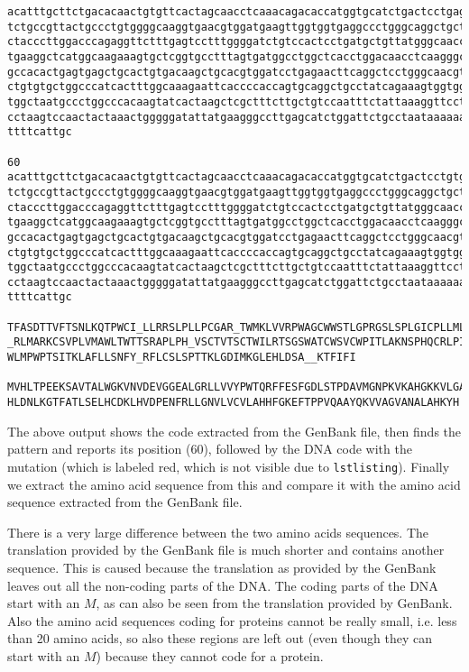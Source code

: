 \documentclass[11pt,a4paper,onecolumn]{article}
\begin{document}
\begin{lstlisting}[mathescape] 
acatttgcttctgacacaactgtgttcactagcaacctcaaacagacaccatggtgcatctgactcctgaggagaag
tctgccgttactgccctgtggggcaaggtgaacgtggatgaagttggtggtgaggccctgggcaggctgctggtggt
ctacccttggacccagaggttctttgagtcctttggggatctgtccactcctgatgctgttatgggcaaccctaagg
tgaaggctcatggcaagaaagtgctcggtgcctttagtgatggcctggctcacctggacaacctcaagggcaccttt
gccacactgagtgagctgcactgtgacaagctgcacgtggatcctgagaacttcaggctcctgggcaacgtgctggt
ctgtgtgctggcccatcactttggcaaagaattcaccccaccagtgcaggctgcctatcagaaagtggtggctggtg
tggctaatgccctggcccacaagtatcactaagctcgctttcttgctgtccaatttctattaaaggttcctttgttc
cctaagtccaactactaaactgggggatattatgaagggccttgagcatctggattctgcctaataaaaaacattta
ttttcattgc

60
acatttgcttctgacacaactgtgttcactagcaacctcaaacagacaccatggtgcatctgactcctgtggagaag
tctgccgttactgccctgtggggcaaggtgaacgtggatgaagttggtggtgaggccctgggcaggctgctggtggt
ctacccttggacccagaggttctttgagtcctttggggatctgtccactcctgatgctgttatgggcaaccctaagg
tgaaggctcatggcaagaaagtgctcggtgcctttagtgatggcctggctcacctggacaacctcaagggcaccttt
gccacactgagtgagctgcactgtgacaagctgcacgtggatcctgagaacttcaggctcctgggcaacgtgctggt
ctgtgtgctggcccatcactttggcaaagaattcaccccaccagtgcaggctgcctatcagaaagtggtggctggtg
tggctaatgccctggcccacaagtatcactaagctcgctttcttgctgtccaatttctattaaaggttcctttgttc
cctaagtccaactactaaactgggggatattatgaagggccttgagcatctggattctgcctaataaaaaacattta
ttttcattgc

TFASDTTVFTSNLKQTPWCI_LLRRSLPLLPCGAR_TWMKLVVRPWAGCWWSTLGPRGSLSPLGICPLLMLLWATLR
_RLMARKCSVPLVMAWLTWTTSRAPLPH_VSCTVTSCTWILRTSGSWATCWSVCWPITLAKNSPHQCRLPIRKWWLV
WLMPWPTSITKLAFLLSNFY_RFLCSLSPTTKLGDIMKGLEHLDSA__KTFIFI

MVHLTPEEKSAVTALWGKVNVDEVGGEALGRLLVVYPWTQRFFESFGDLSTPDAVMGNPKVKAHGKKVLGAFSDGLA
HLDNLKGTFATLSELHCDKLHVDPENFRLLGNVLVCVLAHHFGKEFTPPVQAAYQKVVAGVANALAHKYH
\end{lstlisting}

The above output shows the code extracted from the GenBank file, then finds the pattern and reports its position (60), followed by the DNA code with the mutation (which is labeled red, which is not visible due to \texttt{lstlisting}). Finally we extract the amino acid sequence from this and compare it with the amino acid sequence extracted from the GenBank file. 

There is a very large difference between the two amino acids sequences. The translation provided by the GenBank file is much shorter and contains another sequence. 
This is caused because the translation as provided by the GenBank leaves out all the non-coding parts of the DNA. The coding parts of the DNA start with an $M$, as can also be seen from the translation provided by GenBank. Also the amino acid sequences coding for proteins cannot be really small, i.e. less than 20 amino acids, so also these regions are left out (even though they can start with an $M$) because they cannot code for a protein.
\end{document}
